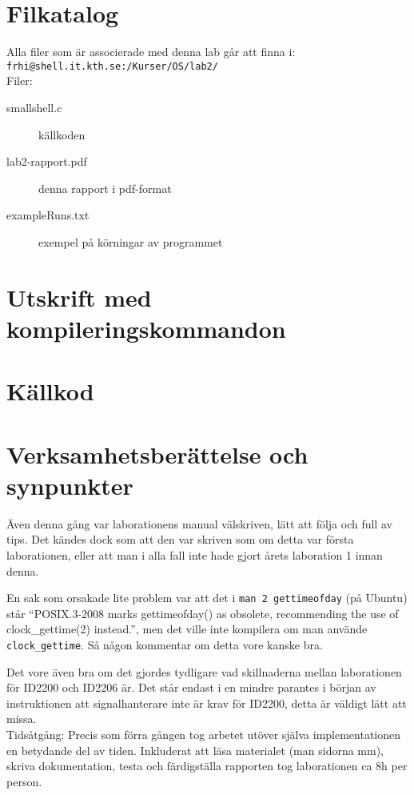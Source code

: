 \documentclass[a4paper]{article}
\begin{document}
\section*{Filkatalog}
Alla filer som är associerade med denna lab går att finna i:\\
\texttt{frhi@shell.it.kth.se:/Kurser/OS/lab2/}
\\
Filer:
\begin{description}
\item[smallshell.c] källkoden
\item[lab2-rapport.pdf] denna rapport i pdf-format
\item[exampleRuns.txt] exempel på körningar av programmet
\end{description}

\section*{Utskrift med kompileringskommandon}
%

\section*{Källkod}


\section*{Verksamhetsberättelse och synpunkter}
Även denna gång var laborationens manual välskriven, lätt att följa och full av tips. Det kändes dock som att den var skriven som om detta var första laborationen, eller att man i alla fall inte hade gjort årets laboration 1 innan denna.

En sak som orsakade lite problem var att det i \texttt{man 2 gettimeofday} (på Ubuntu) står ``POSIX.3-2008 marks gettimeofday() as obsolete, recommending the use of clock\_gettime(2) instead.'', men det ville inte kompilera om man använde \texttt{clock\_gettime}. Så någon kommentar om detta vore kanske bra.

Det vore även bra om det gjordes tydligare vad skillnaderna mellan laborationen för ID2200 och ID2206 är. Det står endast i en mindre parantes i början av instruktionen att signalhanterare inte är krav för ID2200, detta är väldigt lätt att missa.
\\
Tidsåtgång: Precis som förra gången tog arbetet utöver själva implementationen en betydande del av tiden. Inkluderat att läsa materialet (man sidorna mm), skriva dokumentation, testa och färdigställa rapporten tog laborationen ca 8h per person.
\end{document}
